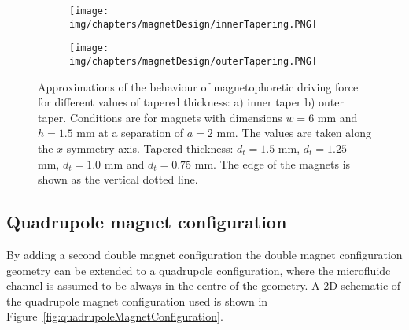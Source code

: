 \begin{figure}[!htb]
\centering
	\begin{subfigure}[b]{0.48\textwidth}
		\texttt{[image: img/chapters/magnetDesign/innerTapering.PNG]}
	\caption{}
    \label{fig:innterTaperDrivingForce}
    \end{subfigure}
    \hfill
	\begin{subfigure}[b]{0.48\textwidth}
		\texttt{[image: img/chapters/magnetDesign/outerTapering.PNG]}
	\caption{}
	\label{fig:outerTaperDrivingForce} 
	\end{subfigure}
\caption[Approximations of the behaviour of magnetophoretic driving force for different values of tapered thickness]{Approximations of the behaviour of magnetophoretic driving force for different values of tapered thickness: a) inner taper b) outer taper. Conditions are for magnets with dimensions $w=6$ mm and $h=1.5$ mm at a separation of $a=2$ mm. The values are taken along the $x$ symmetry axis. Tapered thickness: $d_{t}=1.5$ mm, $d_{t}=1.25$ mm, $d_{t}=1.0$ mm and $d_{t}=0.75$ mm. The edge of the magnets is shown as the vertical dotted line.}%
\label{fig:taperedMagnetDrivingForce}
\end{figure}


\subsection{Quadrupole magnet configuration}\label{subsec:quadrupoleMagnetConfiguration}
By adding a second double magnet configuration the double magnet configuration geometry can be extended to a quadrupole configuration, where the microfluidc channel is assumed to be always in the centre of the geometry. A 2D schematic of the quadrupole magnet configuration used is shown in Figure~\ref{fig:quadrupoleMagnetConfiguration}.

